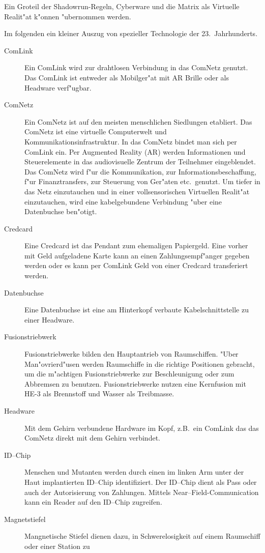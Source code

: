 Ein Gro\3teil der Shadowrun-Regeln, Cyberware und die Matrix als Virtuelle Realit"at k"onnen "ubernommen werden.

Im folgenden ein kleiner Auszug von spezieller Technologie der 23.~Jahrhunderts.

\begin{description}
\item [ComLink] Ein ComLink wird zur drahtlosen Verbindung in das ComNetz genutzt. Das ComLink ist entweder als
      Mobilger"at mit AR Brille oder als Headware verf"ugbar.
\item [ComNetz] Ein ComNetz ist auf den meisten menschlichen Siedlungen etabliert. Das ComNetz ist eine virtuelle
      Computerwelt und Kommunikationsinfrastruktur. In das ComNetz bindet man sich per ComLink ein. Per Augmented Reality (AR) werden Informationen und Steuerelemente in das audiovisuelle Zentrum der Teilnehmer eingeblendet. Das ComNetz wird f"ur die Kommunikation, zur Informationsbeschaffung, f"ur Finanztransfers, zur Steuerung von Ger"aten etc.~genutzt. Um tiefer in das Netz einzutauchen und in einer vollsensorischen Virtuellen Realit"at einzutauchen, wird eine kabelgebundene Verbindung "uber eine Datenbuchse ben"otigt.
\item [Credcard] Eine Credcard ist das Pendant zum ehemaligen Papiergeld. Eine vorher mit Geld aufgeladene Karte kann an
      einen Zahlungsempf"anger gegeben werden oder es kann per ComLink Geld von einer Credcard transferiert werden.
\item [Datenbuchse] Eine Datenbuchse ist eine am Hinterkopf verbaute Kabelschnittstelle zu einer Headware.
\item [Fusionstriebwerk] Fusionstriebwerke bilden den Hauptantrieb von Raumschiffen. "Uber Man"ovrierd"usen werden
      Raumschiffe in die richtige Positionen gebracht, um die m"achtigen Fusionstriebwerke zur Beschleunigung oder zum Abbremsen zu benutzen. Fusionstriebwerke nutzen eine Kernfusion mit HE-3 als Brennstoff und Wasser als Treibmasse.
\item [Headware] Mit dem Gehirn verbundene Hardware im Kopf, z.B.~ein ComLink das das ComNetz direkt mit dem Gehirn
      verbindet.
\item [ID--Chip] Menschen und Mutanten werden durch einen im linken Arm unter der Haut implantierten ID--Chip
      identifiziert. Der ID--Chip dient als Pass oder auch der Autorisierung von Zahlungen. Mittels Near--Field-Communication kann ein Reader auf den ID--Chip zugreifen.
\item [Magnetstiefel] Mangnetische Stiefel dienen dazu, in Schwerelosigkeit auf einem Raumschiff oder einer Station zu

\end{description}
